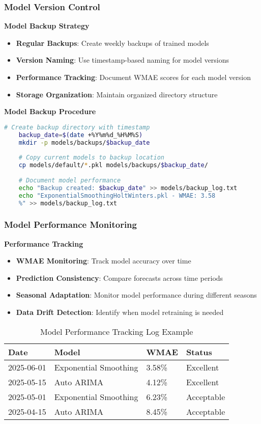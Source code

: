 \subsubsection{Model Version Control}

\textbf{Model Backup Strategy}
\begin{itemize}
	\item \textbf{Regular Backups}: Create weekly backups of trained models
	\item \textbf{Version Naming}: Use timestamp-based naming for model versions
	\item \textbf{Performance Tracking}: Document WMAE scores for each model version
	\item \textbf{Storage Organization}: Maintain organized directory structure
\end{itemize}

\textbf{Model Backup Procedure}
\begin{lstlisting}[language=bash, basicstyle=\color{blue}]
	# Create backup directory with timestamp
	backup_date=$(date +%Y%m%d_%H%M%S)
	mkdir -p models/backups/$backup_date
	
	# Copy current models to backup location
	cp models/default/*.pkl models/backups/$backup_date/
	
	# Document model performance
	echo "Backup created: $backup_date" >> models/backup_log.txt
	echo "ExponentialSmoothingHoltWinters.pkl - WMAE: 3.58
	%" >> models/backup_log.txt
\end{lstlisting}

\subsubsection{Model Performance Monitoring}

\textbf{Performance Tracking}
\begin{itemize}
	\item \textbf{WMAE Monitoring}: Track model accuracy over time
	\item \textbf{Prediction Consistency}: Compare forecasts across time periods
	\item \textbf{Seasonal Adaptation}: Monitor model performance during different seasons
	\item \textbf{Data Drift Detection}: Identify when model retraining is needed
\end{itemize}

\begin{table}[H]
	\centering
	\begin{tabularx}{\textwidth}{|X|X|X|X|}
		\hline
		\textbf{Date} & \textbf{Model} & \textbf{WMAE} & \textbf{Status} \\
		\hline
		2025-06-01 & Exponential Smoothing & 3.58\% & Excellent \\
		2025-05-15 & Auto ARIMA & 4.12\% & Excellent \\
		2025-05-01 & Exponential Smoothing & 6.23\% & Acceptable \\
		2025-04-15 & Auto ARIMA & 8.45\% & Acceptable \\
		\hline
	\end{tabularx}
	\caption{Model Performance Tracking Log Example}
	\label{tab:performance_tracking}
\end{table}

